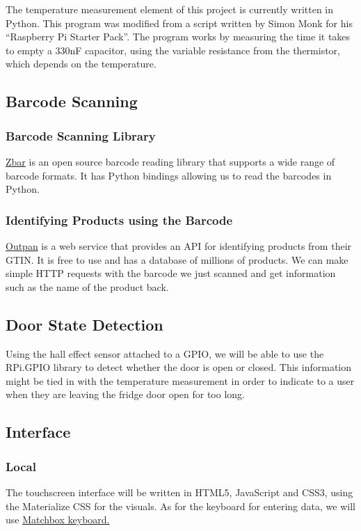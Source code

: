 \documentclass[10pt]{article}
\begin{document}
The temperature measurement element of this project is currently written in Python. This program was modified from a script written by Simon Monk for his ``Raspberry Pi Starter Pack''. The program works by measuring the time it takes to empty a 330nF capacitor, using the variable resistance from the thermistor, which depends on the temperature. 

\newpage
\subsection{Barcode Scanning}
\subsubsection{Barcode Scanning Library}

\href{http://zbar.sourceforge.net/}{Zbar} is an open source barcode reading library that supports a wide range of barcode formats. It has Python bindings allowing us to read the barcodes in Python.

\subsubsection{Identifying Products using the Barcode}


\href{https://www.outpan.com/}{Outpan} is a web service that provides an API for identifying products from their GTIN. It is free to use and has a database of millions of products. We can make simple HTTP requests with the barcode we just scanned and get information such as the name of the product back.

\subsection{Door State Detection}

Using the hall effect sensor attached to a GPIO, we will be able to use the RPi.GPIO library to detect whether the door is open or closed. This information might be tied in with the temperature measurement in order to indicate to a user when they are leaving the fridge door open for too long.

\newpage
\subsection{Interface}
\subsubsection{Local}
The touchscreen interface will be written in HTML5, JavaScript and CSS3, using the Materialize CSS for the visuals. As for the keyboard for entering data, we will use \href{https://github.com/xlab/matchbox-keyboard}{Matchbox keyboard.}
\end{document}

